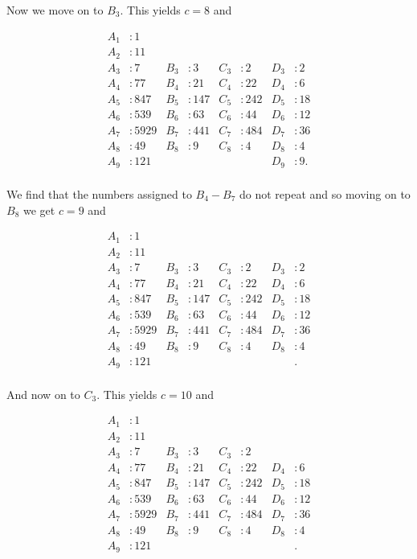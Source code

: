 \documentclass[12pt, a4paper]{article}
\begin{document}
\noindent Now we move on to $B_3$. This yields $c=8$ and 

\begin{align*}
        A_1 & : 1 &  &  &  &  &  & \\
        A_2 & : 11 &  &  &  &  &  & \\ 
        A_3 & : 7 & B_3 & : 3 & C_3 & : 2& D_3 & : 2\\ 
        A_4 & : 77 & B_4 & : 21 & C_4 & : 22& D_4 & : 6\\
        A_5 & : 847 & B_5 & : 147& C_5 & : 242& D_5 & : 18\\ 
        A_6 & : 539& B_6 & : 63& C_6 & : 44& D_6 & : 12\\ 
        A_7 & : 5929& B_7 & :441 & C_7 & : 484& D_7 & : 36 \\ 
        A_8 & : 49& B_8 & : 9 & C_8 & : 4& D_8 & : 4 \\ 
        A_9 & : 121& & & & & D_9 & : 9. \\ 
\end{align*}

\newpage

\noindent We find that the numbers assigned to $B_4-B_7$ do not repeat and so moving on to $B_8$ we get $c=9$ and 

\begin{align*}
        A_1 & : 1 &  &  &  &  &  & \\
        A_2 & : 11 &  &  &  &  &  & \\ 
        A_3 & : 7 & B_3 & : 3 & C_3 & : 2& D_3 & : 2\\ 
        A_4 & : 77 & B_4 & : 21 & C_4 & : 22& D_4 & : 6\\
        A_5 & : 847 & B_5 & : 147& C_5 & : 242& D_5 & : 18\\ 
        A_6 & : 539& B_6 & : 63& C_6 & : 44& D_6 & : 12\\ 
        A_7 & : 5929& B_7 & :441 & C_7 & : 484& D_7 & : 36 \\ 
        A_8 & : 49& B_8 & : 9 & C_8 & : 4& D_8 & : 4 \\ 
        A_9 & : 121& & & & &  & . \\ 
\end{align*}

\noindent And now on to $C_3$. This yields $c=10$ and 

\begin{align*}
        A_1 & : 1 &  &  &  &  &  & \\
        A_2 & : 11 &  &  &  &  &  & \\ 
        A_3 & : 7 & B_3 & : 3 & C_3 & : 2&  & \\ 
        A_4 & : 77 & B_4 & : 21 & C_4 & : 22& D_4 & : 6\\
        A_5 & : 847 & B_5 & : 147& C_5 & : 242& D_5 & : 18\\ 
        A_6 & : 539& B_6 & : 63& C_6 & : 44& D_6 & : 12\\ 
        A_7 & : 5929& B_7 & :441 & C_7 & : 484& D_7 & : 36 \\ 
        A_8 & : 49& B_8 & : 9 & C_8 & : 4& D_8 & : 4 \\ 
        A_9 & : 121& & & & &  & . \\ 
\end{align*}
\end{document}
